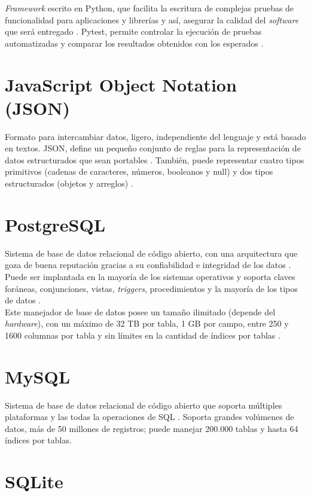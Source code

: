 \textit{Framework} escrito en Python, que facilita la escritura de
complejas pruebas de funcionalidad para aplicaciones y librerías y así,
asegurar la calidad del \textit{software} que será entregado \cite{pytest}. Pytest, permite controlar la ejecución de pruebas automatizadas y comparar los resultados obtenidos con los esperados \cite{pytest}.

\section{JavaScript Object Notation (JSON)}

Formato para intercambiar datos, ligero, independiente del lenguaje y está basado en textos. JSON, define un pequeño conjunto de reglas para la representación de datos estructurados que sean portables \cite{JSON}. También, puede representar cuatro tipos primitivos (cadenas de caracteres, números, booleanos y null) y dos tipos estructurados (objetos y arreglos) \cite{JSON}.

\section{PostgreSQL}

Sistema de base de datos relacional de código abierto, con una arquitectura que goza de buena reputación gracias a su confiabilidad e integridad de los datos \cite{PostgreSQL}. Puede ser implantada en la mayoría de los sistemas operativos y soporta claves foráneas, conjunciones, vistas, \textit{triggers}, procedimientos y la mayoría de los tipos de datos \cite{PostgreSQL}. \\

Este manejador de base de datos posee un tamaño ilimitado (depende del \textit{hardware}), con un máximo de 32 TB por tabla, 1 GB por campo, entre 250 y 1600 columnas por tabla y sin límites en la cantidad de índices por tablas \cite{PostgreSQL}.

\section{MySQL}

Sistema de base de datos relacional de código abierto que soporta múltiples plataformas y las todas la operaciones de SQL \cite{MySQL}. Soporta grandes volúmenes de datos, más de 50 millones de registros; puede manejar 200.000 tablas y hasta 64 índices por tablas\cite{MySQL}.

\section{SQLite}

